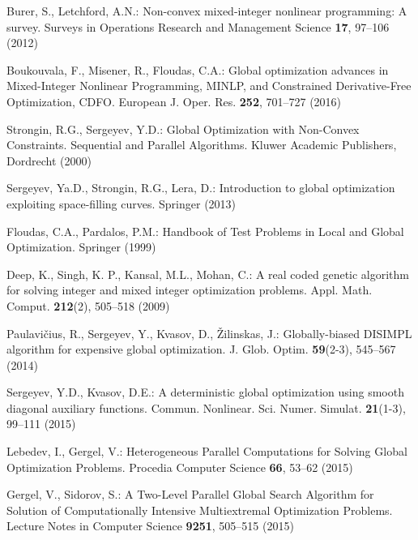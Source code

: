 \documentclass{llncs}
\begin{document}
\begin{thebibliography}{10}

Burer, S., Letchford, A.N.: Non-convex mixed-integer nonlinear programming: A survey. Surveys in Operations Research and Management Science \textbf{17}, 97--106 (2012) 

Boukouvala, F., Misener, R., Floudas, C.A.: Global optimization advances in Mixed-Integer Nonlinear Programming, MINLP, and Constrained Derivative-Free Optimization, CDFO. European J. Oper. Res. \textbf{252}, 701--727 (2016) 

Strongin, R.G., Sergeyev, Y.D.: Global Optimization with Non-Convex Constraints. Sequential and Parallel Algorithms. Kluwer Academic Publishers, Dordrecht (2000) %

Sergeyev, Ya.D., Strongin, R.G., Lera, D.: Introduction to global optimization exploiting space-filling curves. Springer (2013) %

Floudas, C.A., Pardalos, P.M.:  Handbook of Test Problems in Local and Global Optimization. Springer (1999)  %

Deep, K., Singh, K. P., Kansal, M.L., Mohan, C.: A real coded genetic algorithm for solving integer and mixed integer optimization problems. Appl. Math. Comput. \textbf{212}(2), 505--518 (2009)


Paulavi\v{c}ius, R., Sergeyev, Y., Kvasov, D., \v{Z}ilinskas, J.: Globally-biased DISIMPL algorithm for expensive global optimization. J. Glob. Optim. \textbf{59}(2-3), 545--567 (2014)

Sergeyev, Y.D., Kvasov, D.E.: A deterministic global optimization using smooth diagonal auxiliary functions. Commun. Nonlinear. Sci. Numer. Simulat. \textbf{21}(1-3), 99--111 (2015)

Lebedev, I., Gergel, V.: Heterogeneous Parallel Computations for Solving Global Optimization Problems. Procedia Computer Science \textbf{66}, 53--62 (2015)

Gergel, V., Sidorov, S.: A Two-Level Parallel Global Search Algorithm for Solution of Computationally Intensive Multiextremal Optimization Problems. Lecture Notes in Computer Science  \textbf{9251}, 505--515 (2015)


\end{thebibliography}
\end{document}
